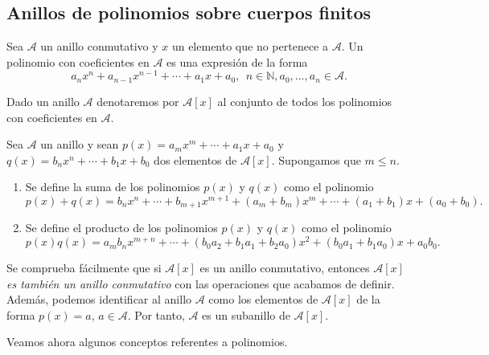 \subsection{Anillos de polinomios sobre cuerpos finitos}

\begin{definicion}
    Sea $\mathcal{A}$ un anillo conmutativo y $x$ un elemento que no pertenece a $\mathcal{A}$. Un polinomio con coeficientes en $\mathcal{A}$ es una expresión de la forma
    $$a_nx^n + a_{n-1}x^{n-1} + \cdots + a_1x + a_0, \ \ n \in \mathds{N}, a_0,\dots ,a_n \in \mathcal{A}.$$
\end{definicion}

Dado un anillo $\mathcal{A}$ denotaremos por $\mathcal{A}[x]$ al conjunto de todos los polinomios con coeficientes en $\mathcal{A}$.

\begin{definicion} Sea $\mathcal{A}$ un anillo y sean $p(x) = a_mx^m + \cdots + a_1x + a_0$ y $q(x) = b_nx^n + \cdots + b_1x + b_0$ dos elementos de $\mathcal{A}[x]$. Supongamos que $m \leq n$.

    \begin{enumerate}
        \item Se define la suma de los polinomios $p(x)$ y $q(x)$ como el polinomio $$p(x) + q(x) = b_nx^n + \cdots + b_{m+1}x^{m+1} + (a_m + b_m)x^m + \cdots + (a_1 + b_1)x + (a_0 + b_0).$$
        \item Se define el producto de los polinomios $p(x)$ y $q(x)$ como el polinomio $$p(x)q(x) = a_mb_nx^{m + n} + \cdots + (b_0a_2 + b_1a_1 + b_2a_0)x^2 + (b_0a_1 + b_1a_0)x + a_0b_0.$$

    \end{enumerate}
    
\end{definicion}

Se comprueba fácilmente que si $\mathcal{A}[x]$ es un anillo conmutativo, entonces $\mathcal{A}[x]$  \emph{es también un anillo conmutativo} con las operaciones que acabamos de definir. Además, podemos identificar al anillo $\mathcal{A}$ como los elementos de $\mathcal{A}[x]$ de la forma $p(x) = a$, $a \in \mathcal{A}$. Por tanto, $\mathcal{A}$ es un subanillo de  $\mathcal{A}[x]$.

Veamos ahora algunos conceptos referentes a polinomios.

